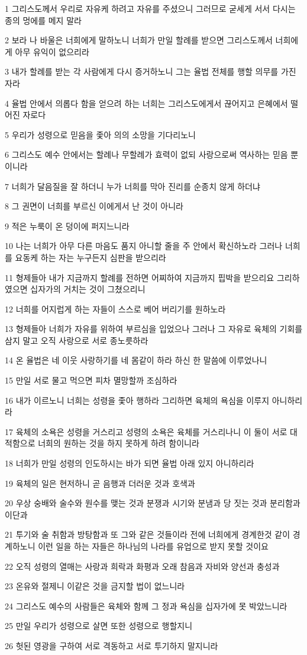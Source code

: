 \par 1 그리스도께서 우리로 자유케 하려고 자유를 주셨으니 그러므로 굳세게 서서 다시는 종의 멍에를 메지 말라
\par 2 보라 나 바울은 너희에게 말하노니 너희가 만일 할례를 받으면 그리스도께서 너희에게 아무 유익이 없으리라
\par 3 내가 할례를 받는 각 사람에게 다시 증거하노니 그는 율법 전체를 행할 의무를 가진 자라
\par 4 율법 안에서 의롭다 함을 얻으려 하는 너희는 그리스도에게서 끊어지고 은혜에서 떨어진 자로다
\par 5 우리가 성령으로 믿음을 좇아 의의 소망을 기다리노니
\par 6 그리스도 예수 안에서는 할례나 무할례가 효력이 없되 사랑으로써 역사하는 믿음 뿐이니라
\par 7 너희가 달음질을 잘 하더니 누가 너희를 막아 진리를 순종치 않게 하더냐
\par 8 그 권면이 너희를 부르신 이에게서 난 것이 아니라
\par 9 적은 누룩이 온 덩이에 퍼지느니라
\par 10 나는 너희가 아무 다른 마음도 품지 아니할 줄을 주 안에서 확신하노라 그러나 너희를 요동케 하는 자는 누구든지 심판을 받으리라
\par 11 형제들아 내가 지금까지 할례를 전하면 어찌하여 지금까지 핍박을 받으리요 그리하였으면 십자가의 거치는 것이 그쳤으리니
\par 12 너희를 어지럽게 하는 자들이 스스로 베어 버리기를 원하노라
\par 13 형제들아 너희가 자유를 위하여 부르심을 입었으나 그러나 그 자유로 육체의 기회를 삼지 말고 오직 사랑으로 서로 종노릇하라
\par 14 온 율법은 네 이웃 사랑하기를 네 몸같이 하라 하신 한 말씀에 이루었나니
\par 15 만일 서로 물고 먹으면 피차 멸망할까 조심하라
\par 16 내가 이르노니 너희는 성령을 좇아 행하라 그리하면 육체의 욕심을 이루지 아니하리라
\par 17 육체의 소욕은 성령을 거스리고 성령의 소욕은 육체를 거스리나니 이 둘이 서로 대적함으로 너희의 원하는 것을 하지 못하게 하려 함이니라
\par 18 너희가 만일 성령의 인도하시는 바가 되면 율법 아래 있지 아니하리라
\par 19 육체의 일은 현저하니 곧 음행과 더러운 것과 호색과
\par 20 우상 숭배와 술수와 원수를 맺는 것과 분쟁과 시기와 분냄과 당 짓는 것과 분리함과 이단과
\par 21 투기와 술 취함과 방탕함과 또 그와 같은 것들이라 전에 너희에게 경계한것 같이 경계하노니 이런 일을 하는 자들은 하나님의 나라를 유업으로 받지 못할 것이요
\par 22 오직 성령의 열매는 사랑과 희락과 화평과 오래 참음과 자비와 양선과 충성과
\par 23 온유와 절제니 이같은 것을 금지할 법이 없느니라
\par 24 그리스도 예수의 사람들은 육체와 함께 그 정과 욕심을 십자가에 못 박았느니라
\par 25 만일 우리가 성령으로 살면 또한 성령으로 행할지니
\par 26 헛된 영광을 구하여 서로 격동하고 서로 투기하지 말지니라

